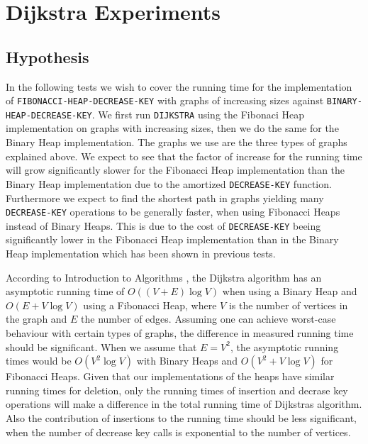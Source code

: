 \documentclass[a4paper,10pt]{article}
\begin{document}
\section{Dijkstra Experiments}

\subsection{Hypothesis}
In the following tests we wish to cover the running time for the implementation of \texttt{FIBONACCI\--HEAP\--DECREASE\--KEY} with graphs of increasing sizes against \texttt{BINARY\--HEAP\--DECREASE\--KEY}. We first run \texttt{DIJKSTRA} using the Fibonaci Heap implementation on graphs with increasing sizes, then we do the same for the Binary Heap implementation. The graphs we use are the three types of graphs explained above. We expect to see that the factor of increase for the running time will grow significantly slower for the Fibonacci Heap implementation than the Binary Heap implementation due to the amortized  \texttt{DECREASE-KEY} function. Furthermore we expect to find the shortest path in graphs yielding many \texttt{DECREASE-KEY} operations to be generally faster, when using Fibonacci Heaps instead of Binary Heaps. This is due to the cost of \texttt{DECREASE-KEY} beeing significantly lower in the Fibonacci Heap implementation than in the Binary Heap implementation which has been shown in previous tests.

According to Introduction to Algorithms \cite[page 662]{clrs}, the Dijkstra algorithm has an asymptotic running time of $O((V+E)\log V)$ when using a Binary Heap and $O(E + V\log V)$ using a Fibonacci Heap, where $V$ is the number of vertices in the graph and $E$ the number of edges. Assuming one can achieve worst-case behaviour with certain types of graphs, the difference in measured running time should be significant.
When we assume that $E=V^2$, the asymptotic running times would be $O(V^2 \log V)$ with Binary Heaps and $O(V^2 + V\log V)$ for Fibonacci Heaps.
Given that our implementations of the heaps have similar running times for deletion, only the running times of insertion and decrase key operations will make a difference in the total running time of Dijkstras algorithm. Also the contribution of insertions to the running time should be less significant, when the number of decrease key calls is exponential to the number of vertices. 
\end{document}

